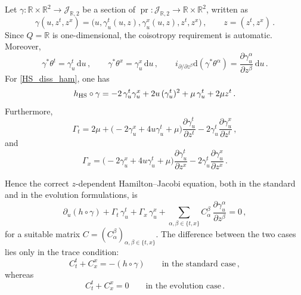 \documentclass[11pt,twoside]{article}
\theoremstyle{plain}
\theoremstyle{definition}
\theoremstyle{remark}
\renewcommand{\d}{\mathrm{d}}
\begin{document}
Let
\(
\gamma\colon \mathbb R\times\mathbb R^2\to \mathcal J_{\mathbb R,2}
\)
be a section of
\(
\operatorname{pr}\colon \mathcal J_{\mathbb R,2}\to \mathbb R\times\mathbb R^2
\),
written as
\begin{equation}\label{eq:HS_gamma_zdep}
\gamma(u,z^t,z^x)=\bigl(u,\gamma_u^t(u,z),\gamma_u^x(u,z),z^t,z^x\bigr)\,,
\qquad z=(z^t,z^x)\,.
\end{equation}
Since $Q=\mathbb R$ is one-dimensional, the coisotropy requirement is automatic. Moreover,
\[
\gamma^*\theta^t=\gamma_u^t\,\d u\,,\qquad \gamma^*\theta^x=\gamma_u^x\,\d u\,,
\qquad
i_{\partial/\partial z^\beta}\d(\gamma^*\theta^\alpha)=\frac{\partial\gamma_u^\alpha}{\partial z^\beta}\,\d u\,.
\]
For \eqref{HS_diss_ham}, one has
\begin{equation}\label{eq:HS_h_gamma}
h_{\rm HS}\circ\gamma=-2\,\gamma_u^t\gamma_u^x+2u\,(\gamma_u^t)^2+\mu\,\gamma_u^t+2\mu z^t\,.
\end{equation}
Furthermore,
\begin{equation}\label{eq:HS_Gamma_t}
\Gamma_t=2\mu+\bigl(-2\gamma_u^x+4u\gamma_u^t+\mu\bigr)\frac{\partial\gamma_u^t}{\partial z^t}-2\gamma_u^t\frac{\partial\gamma_u^x}{\partial z^t}\,,
\end{equation}
and
\begin{equation}\label{eq:HS_Gamma_x}
\Gamma_x=\bigl(-2\gamma_u^x+4u\gamma_u^t+\mu\bigr)\frac{\partial\gamma_u^t}{\partial z^x}-2\gamma_u^t\frac{\partial\gamma_u^x}{\partial z^x}\,.
\end{equation}

Hence the correct $z$-dependent Hamilton--Jacobi equation, both in the standard and in the evolution formulations, is
\begin{equation}\label{eq:HS_zdep_HJ_correct}
\partial_u(h\circ\gamma)+\Gamma_t\,\gamma_u^t+\Gamma_x\,\gamma_u^x+\sum_{\alpha,\beta\in\{t,x\}}C_\alpha^{\beta}\,\frac{\partial\gamma_u^\alpha}{\partial z^\beta}=0\,,
\end{equation}
for a suitable matrix $C=(C_\alpha^{\beta})_{\alpha,\beta\in\{t,x\}}$. The difference between the two cases lies only in the trace condition:
\begin{equation}\label{eq:HS_zdep_trace_standard}
C_t^t+C_x^x=-(h\circ\gamma)
\qquad\text{in the standard case}\,,
\end{equation}
whereas
\begin{equation}\label{eq:HS_zdep_trace_evol}
C_t^t+C_x^x=0
\qquad\text{in the evolution case}\,.
\end{equation}
\end{document}
